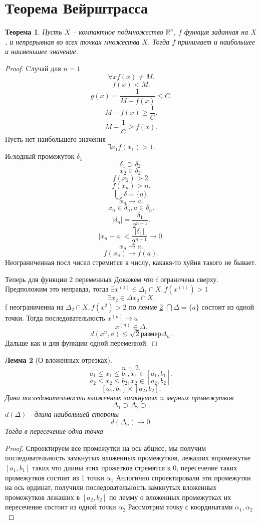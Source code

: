 \documentclass[14pt]{extarticle}
\newtheorem{theorem}{Теорема}
\newtheorem{lemma}[theorem]{Лемма}
\begin{document}
\section{Теорема Вейрштрасса}
\begin{theorem}
    Пусть $X$ -- компактное подмножество $\mathbb{R}^{n}$, $f$ функция заданная на  $X$, и непрерывная во всех точках множества  $X$. Тогда $f$ принимает и наибольшее и наименьшее значение.
\end{theorem}
\begin{proof}
    Cлучай для $n  = 1$
    \[
    \forall  x f(x) \neq M
    .\] 
    \[
    f(x) < M
    .\] 
    \[
    g(x) = \frac{1}{M - f(x)} \le  C
    .\] 
    \[
    M - f(x) \ge  \frac{1}{C}
    .\] 
    \[
    M - \frac{1}{C} \ge  f(x)
    .\] 
    Пусть нет наибольшего значения
    \[
    \exists  x_1  f(x_1) > 1
    .\] 
    Иcходный промежуток  $\delta_1$
    \[
        \delta_1 \supset \delta_2
    .\]
    \[
    x_2 \in \delta_2
    .\] 
    \[
    f(x_2) > 2
    .\] 
    \[
    f(x_{n}) > n
    .\] 
    \[
        \bigcup  \delta = \{a\}
    .\]
    \[
    x_{n} \to a
    .\] 
    \[
    x_{n} \in \delta_{n}, a \in \delta_{n}
    .\] 
    \[
    |\delta_{n}| = \frac{|\delta_1|}{2^{n-1}}
    .\] 
    \[
    |x_{n} - a| < \frac{|\delta_{1}|}{2^{n - 1}} \to 0
    .\] 
    \[
    x_{n} \to a
    .\] 
    \[
    f(x_{n}) \to f(a)
    .\] 
    Неограниченная посл чисел стремится к числу, какакя-то хуйня такого не бывает.
    
    Теперь для функции $2$ переменных
    Докажем что  f ограничена сверху. Предположим это неправда, тогда $\exists x^{(1)} \in \Delta_{1} \cap X,  f(x^{(1)}) >  1$
    \[
   \exists x_2 \in  \Delta x_2 \cap X
    .\] 
    f неограниченна на $\Delta_2 \cap X, f(x^{2}) > 2$
    по лемме \ref{1} $\bigcap \Delta = \{a\}$ состоит из одной точки.
    Тогда последовательность $x^{(n)} \to a$
    \[
    x^{(n)} \in \Delta
    .\] 
    \[
        d(x^{n},a) \le \sqrt{2} \text{размер} \Delta_{n}
    .\] 
    Дальше как и для функции одной переменной.
\end{proof}
\begin{lemma}[О вложенных отрезках] \label{1}
    \[
    n  = 2
    .\] 
    \[
        a_1 \le  x_1 \le  b_1 , x_1 \in [a_1,b_1]
    .\] 
    \[
        a_2 \le  x_2 \le  b_2 , x_2 \in [a_2,b_2]
    .\] 
    \[
        [a_1,b_1] \times [a_2,b_2]
    .\]  
    Дана последовательность вложенных замкнутых $n$ мерных промежутков
    \[
    \varDelta_{1}  \supset \varDelta_2 \supset 
    .\] 
    $d(\varDelta)$ -  длина наибольшей стороны
     \[
    d(\varDelta_{n}) \to 0
    .\] 
    Тогда в пересечение одна точка
\end{lemma}
\begin{proof}
    Спроектируем все промежутки на ось абцисс, мы получим последовательность замкнутых вложенных промежутков, лежаших впромежутке $[a_1,b_1]$ таких что длины этих прожетков стремятся к 0, пересечение таких промежутков состоит из 1 точки $\alpha_1$
    Анлогично спроектировали эти промежутки на ось ординат, получили последовательность замкнутых вложенных промежутков лежаших в $[a_2,b_2]$ по лемму о вложенных промежутках их пересечение  состоит из одной точки $\alpha_2$
    Рассмотрим точку с координатами $\alpha_1,\alpha_2$
\end{proof}
\end{document}
